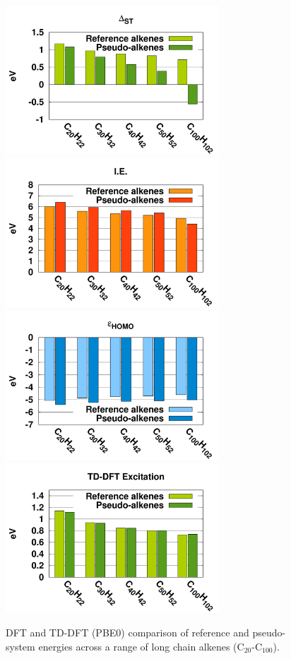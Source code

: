 \documentclass[12pt]{article}
\begin{document}
\begin{figure}
\begin{center}
\includegraphics[width=8cm]{long_pbe0_st}
\includegraphics[width=8cm]{long_pbe0_ie}
\includegraphics[width=8cm]{long_pbe0_homo}
\includegraphics[width=8cm]{long_pbe0_tddft}
\end{center}
\vspace{0.25in}
\hspace*{3in}

\caption{DFT and TD-DFT (PBE0) comparison of reference and pseudo-system energies across a range of long chain alkenes (C\(_{20}\)-C\(_{100}\)).}
\label{fig:long_chain_graphs}
\end{figure}
\end{document}
